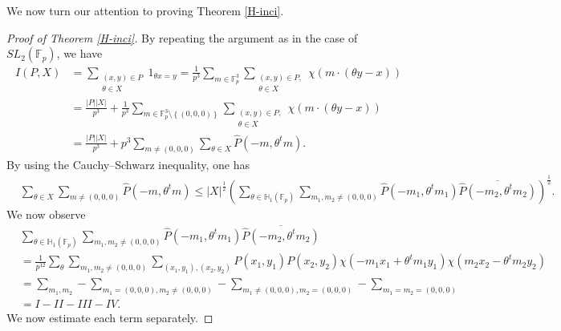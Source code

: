 \documentclass[11pt]{article}
\def\Fbb{\mathbb{F}}
\def\l({\left(}
\def\r){\right)}
\def\lv{\left\vert}
\def\rv{\right\vert}
\def\lo{\left\{}
\def\ro{\right\}}
\begin{document}

We now turn our attention to proving Theorem \ref{H-inci}.
\begin{proof}[Proof of Theorem \ref{H-inci}]
By repeating the argument as in the case of $SL_2(\mathbb{F}_p)$, we have 
    \begin{align*}
        I(P,X) & = \sum_{\substack{(x,y )\in P \\ \theta \in X}} 1_{\theta x=y } =\frac{1}{p^3} \sum_{m\in \Fbb_p^3} \sum_{\substack{(x,y)\in P, \\ \theta \in X}} \chi \l( m\cdot \l( \theta y-x \r) \r) \\
        & = \frac{\lv P\rv \lv X\rv}{p^3} + \frac{1}{p^3} \sum_{ m\in \Fbb_p^3 \setminus \lo (0,0, 0)\ro } \sum_{\substack{ (x,y)\in P ,\\ \theta \in X }} \chi \l( m \cdot \l( \theta y -x \r) \r) \\
        & = \frac{\lv P\rv \lv X\rv}{p^3} + p^3\sum_{m\ne (0, 0, 0)} \sum_{\theta \in X} \widehat{P} \l( -m,\theta^t m\r).
    \end{align*}
By using the Cauchy--Schwarz inequality, one has 
\begin{align*}
    &\sum_{\theta\in X}\sum_{m\ne (0, 0, 0)}\widehat{P}(-m, \theta^tm)\le |X|^{\frac{1}{2}}\left(\sum_{\theta\in \mathbb{H}_1(\Fbb_p)}\sum_{m_1, m_2\ne (0, 0, 0)}\widehat{P}(-m_1, \theta^tm_1)\overline{\widehat{P}(-m_2, \theta^tm_2)}\right)^{\frac{1}{2}}.
\end{align*}
We now observe 
\begin{align*}
    &\sum_{\theta\in \mathbb{H}_1(\Fbb_p)}\sum_{m_1, m_2\ne (0, 0, 0)}\widehat{P}(-m_1, \theta^tm_1)\overline{\widehat{P}(-m_2, \theta^tm_2)}\\&=\frac{1}{p^{12}}\sum_{\theta}\sum_{m_1, m_2\ne (0, 0, 0)}\sum_{(x_1, y_1), (x_2, y_2)}P(x_1, y_1)P(x_2, y_2)\chi(-m_1x_1+\theta^tm_1y_1)\chi(m_2x_2-\theta^tm_2y_2)\\
    &=\sum_{m_1, m_2}-\sum_{m_1=(0, 0, 0), m_2\ne (0, 0, 0)}-\sum_{m_1\ne (0, 0, 0), m_2=(0, 0, 0)}-\sum_{m_1=m_2=(0, 0, 0)}\\
    &=I-II-III-IV.
\end{align*}
We now estimate each term separately. 


\end{proof}
\end{document}
